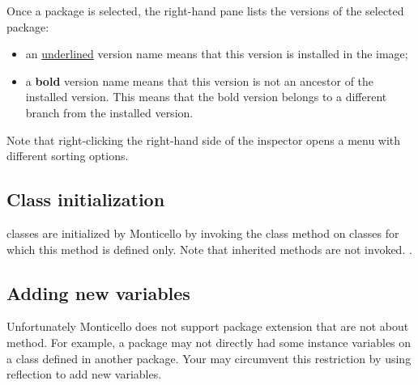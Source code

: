 \documentclass[a4paper,10pt,twoside]{book}
\begin{document}
\noindent
Once a package is selected, the right-hand pane lists the versions of the selected package:

\begin{itemize}
\item an \underline{underlined} version name means that this version is installed in the image;
\item a {\bf bold} version name means that this version is not an ancestor of the installed version. This means that the bold version belongs to a different branch from the installed version.
\end{itemize}
\noindent
Note that right-clicking the right-hand side of the inspector opens a menu with different sorting options.


\subsection{Class initialization}

 classes are initialized by Monticello by invoking the  class method on classes for which this method is defined only. Note that inherited  methods are not invoked.
.

\subsection{Adding new variables}

Unfortunately Monticello does not support package extension that are not about method. For example, a package may not directly had some instance variables on a class defined in another package. Your may circumvent this restriction by using reflection to add new variables. 
\end{document}
